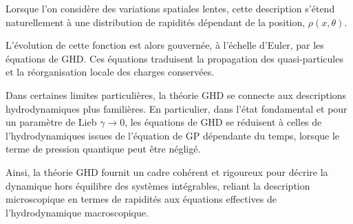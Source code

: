 {%


\medskip
 

Lorsque l’on considère des variations spatiales lentes, cette description s’étend naturellement à une distribution de rapidités dépendant de la position, $\rho(x,\theta)$. 

\medskip

L’évolution de cette fonction est alors gouvernée, à l’échelle d’Euler, par les équations de \gls{GHD}. 
Ces équations traduisent la propagation des quasi-particules et la réorganisation locale des charges conservées.  

\medskip

Dans certaines limites particulières, la théorie \gls{GHD} se connecte aux descriptions hydrodynamiques plus familières. 
En particulier, dans l’état fondamental et pour un paramètre de Lieb $\gamma \to 0$, les équations de \gls{GHD} se réduisent à celles de l’hydrodynamiques issues de l’équation de \gls{GP} dépendante du temps, lorsque le terme de pression quantique peut être négligé. 

\medskip 

Ainsi, la théorie  \gls{GHD} fournit un cadre cohérent et rigoureux pour décrire la dynamique hors équilibre des systèmes intégrables, reliant la description microscopique en termes de rapidités aux équations effectives de l’hydrodynamique macroscopique.
}







